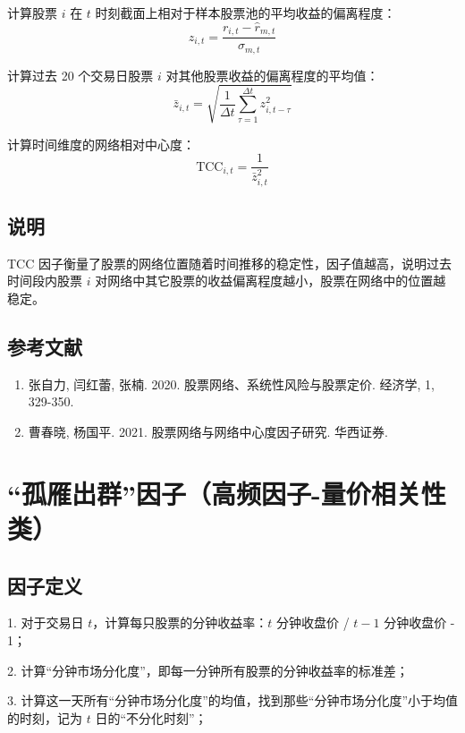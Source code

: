 \documentclass{article}
\begin{document}
计算股票 \( i \) 在 \( t \) 时刻截面上相对于样本股票池的平均收益的偏离程度：
\begin{equation}
    z_{i,t} = \frac{r_{i,t} - \hat{r}_{m,t}}{\sigma_{m,t}}
\end{equation}

计算过去 20 个交易日股票 \( i \) 对其他股票收益的偏离程度的平均值：
\begin{equation}
    \bar{z}_{i,t} = \sqrt{\frac{1}{\Delta t} \sum_{\tau=1}^{\Delta t} z_{i,t-\tau}^2}
\end{equation}

计算时间维度的网络相对中心度：
\begin{equation}
    \mathrm{TCC}_{i,t} = \frac{1}{\bar{z}_{i,t}^2}
\end{equation}

\subsection{说明}
TCC 因子衡量了股票的网络位置随着时间推移的稳定性，因子值越高，说明过去时间段内股票 \( i \) 对网络中其它股票的收益偏离程度越小，股票在网络中的位置越稳定。

\subsection{参考文献}
\begin{enumerate}
    \item 张自力, 闫红蕾, 张楠. 2020. 股票网络、系统性风险与股票定价. 经济学, 1, 329-350.
    \item 曹春晓, 杨国平. 2021. 股票网络与网络中心度因子研究. 华西证券.
\end{enumerate}

\section{“孤雁出群”因子（高频因子-量价相关性类）}

\subsection{因子定义}


1. 对于交易日 \( t \)，计算每只股票的分钟收益率：\( t \) 分钟收盘价 / \( t-1 \) 分钟收盘价 - 1；

2. 计算“分钟市场分化度”，即每一分钟所有股票的分钟收益率的标准差；

3. 计算这一天所有“分钟市场分化度”的均值，找到那些“分钟市场分化度”小于均值的时刻，记为 \( t \) 日的“不分化时刻”；
\end{document}
